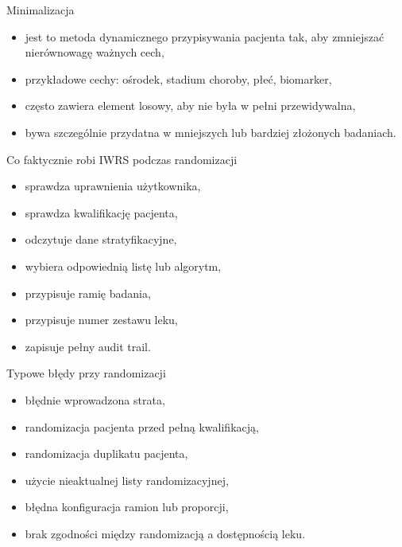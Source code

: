 \begin{frame}{Minimalizacja}
  \begin{itemize}
    \item jest to metoda dynamicznego przypisywania pacjenta tak, aby zmniejszać nierównowagę ważnych cech,
    \item przykładowe cechy: ośrodek, stadium choroby, płeć, biomarker,
    \item często zawiera element losowy, aby nie była w pełni przewidywalna,
    \item bywa szczególnie przydatna w mniejszych lub bardziej złożonych badaniach.
  \end{itemize}
\end{frame}

\begin{frame}{Co faktycznie robi IWRS podczas randomizacji}
  \begin{itemize}
    \item sprawdza uprawnienia użytkownika,
    \item sprawdza kwalifikację pacjenta,
    \item odczytuje dane stratyfikacyjne,
    \item wybiera odpowiednią listę lub algorytm,
    \item przypisuje ramię badania,
    \item przypisuje numer zestawu leku,
    \item zapisuje pełny audit trail.
  \end{itemize}
\end{frame}

\begin{frame}{Typowe błędy przy randomizacji}
  \begin{itemize}
    \item błędnie wprowadzona strata,
    \item randomizacja pacjenta przed pełną kwalifikacją,
    \item randomizacja duplikatu pacjenta,
    \item użycie nieaktualnej listy randomizacyjnej,
    \item błędna konfiguracja ramion lub proporcji,
    \item brak zgodności między randomizacją a dostępnością leku.
  \end{itemize}
\end{frame}

